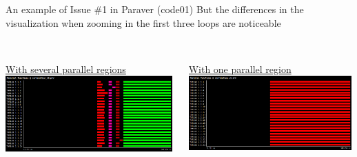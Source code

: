 \documentclass[10pt,xcolor=table]{beamer}
\begin{document}
\begin{frame}{An example of Issue \#1 in Paraver (code01)}
But the differences in the visualization when zooming in the first three loops are noticeable
\centering
\begin{columns}
\begin{column}{0.5\textwidth}
\\\underline{With several parallel regions}
\includegraphics[width=0.99\textwidth]{figs/Parallel_functions@correlation_v0.png}
 \end{column}
 \begin{column}{0.5\textwidth}
 \\\underline{With one parallel region}
\includegraphics[width=0.99\textwidth]{figs/Parallel_functions@correlation_v1.png}
 \end{column}
\end{columns}
\end{frame}
\end{document}
